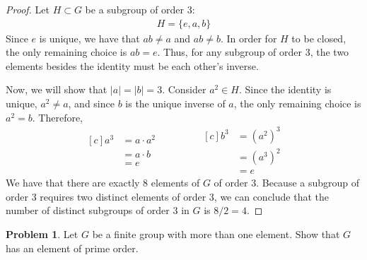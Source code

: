 \documentclass[12pt,reqno]{article}
\theoremstyle{plain}
\theoremstyle{definition}
\newtheorem{problem}{Problem}
\begin{document}
\begin{proof}
    Let \(H\subset G\) be a subgroup of order 3:
    \begin{align*}
        H = \{e, a, b\}
    \end{align*}
    Since \(e\) is unique, we have that \(ab\neq a\) and \(ab\neq b\). In order for \(H\) to be closed, 
    the only remaining choice is \(ab = e\). Thus, for any subgroup of order \(3\), the two elements besides
    the identity must be each other's inverse.

    Now, we will show that \(|a|=|b|=3\). Consider \(a^2\in H\). Since the identity is unique, \(a^2\neq a\),
    and since \(b\) is the unique inverse of \(a\), the only remaining choice is \(a^2=b\). Therefore,
    \begin{equation*}
        \begin{aligned}[c]
            a^3 &= a \cdot a^2 \\
            &= a \cdot b\\
            &= e
        \end{aligned}
        \qquad\qquad
        \begin{aligned}[c]
            b^3 &= (a^2)^3\\
            &= (a^3)^2\\
            &= e
        \end{aligned}
    \end{equation*}
    We have that there are exactly \(8\) elements of \(G\) of order \(3\). Because a subgroup of order \(3\) 
    requires two distinct elements of order \(3\), we can conclude that the number of distinct subgroups of 
    order \(3\) in \(G\) is \(8 / 2 = 4\).
\end{proof}

\newpage


\begin{problem} 
    Let $G$ be a finite group with more than one element. Show that $G$ has an element of prime order.
\end{problem}
\end{document}
